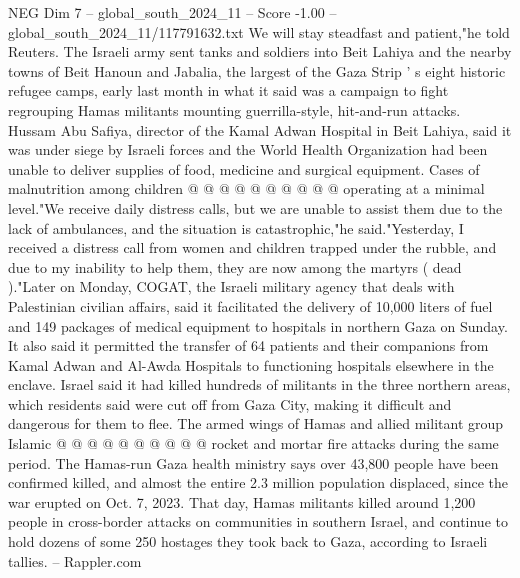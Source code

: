 \begin{textsample}{NEG Dim 7 – global\_south\_2024\_11 – Score -1.00 – global\_south\_2024\_11/117791632.txt}
We will stay steadfast and patient,"he told Reuters.
The Israeli army sent tanks and soldiers into Beit Lahiya and the nearby towns of Beit Hanoun and Jabalia, the largest of the Gaza Strip ' s eight historic refugee camps, early last month in what it said was a campaign to fight regrouping Hamas militants mounting guerrilla-style, hit-and-run attacks.
Hussam Abu Safiya, director of the Kamal Adwan Hospital in Beit Lahiya, said it was under siege by Israeli forces and the World Health Organization had been unable to deliver supplies of food, medicine and surgical equipment.
Cases of malnutrition among children @ @ @ @ @ @ @ @ @ @ operating at a minimal level."We receive daily distress calls, but we are unable to assist them due to the lack of ambulances, and the situation is catastrophic,"he said."Yesterday, I received a distress call from women and children trapped under the rubble, and due to my inability to help them, they are now among the martyrs ( dead )."Later on Monday, COGAT, the Israeli military agency that deals with Palestinian civilian affairs, said it facilitated the delivery of 10,000 liters of fuel and 149 packages of medical equipment to hospitals in northern Gaza on Sunday.
It also said it permitted the transfer of 64 patients and their companions from Kamal Adwan and Al-Awda Hospitals to functioning hospitals elsewhere in the enclave.
Israel said it had killed hundreds of militants in the three northern areas, which residents said were cut off from Gaza City, making it difficult and dangerous for them to flee.
The armed wings of Hamas and allied militant group Islamic @ @ @ @ @ @ @ @ @ @ rocket and mortar fire attacks during the same period.
The Hamas-run Gaza health ministry says over 43,800 people have been confirmed killed, and almost the entire 2.3 million population displaced, since the war erupted on Oct. 7, 2023.
That day, Hamas militants killed around 1,200 people in cross-border attacks on communities in southern Israel, and continue to hold dozens of some 250 hostages they took back to Gaza, according to Israeli tallies. -- Rappler.com

\end{textsample}
